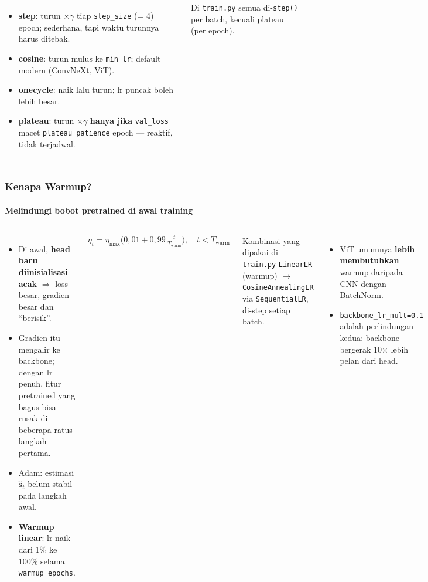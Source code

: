 \documentclass[t,aspectratio=169,xcolor={dvipsnames,table}]{beamer}
\newcommand{\con}[1]{\textcolor{dlOrange}{#1}}
\begin{document}
\begin{frame}
\begin{columns}[T]
        \begin{itemize}
            \item \textbf{step}: turun $\times\gamma$ tiap \texttt{step\_size} (= 4) epoch; sederhana, tapi waktu turunnya harus ditebak.
            \item \textbf{cosine}: turun mulus ke \texttt{min\_lr}; default modern (ConvNeXt, ViT).
            \item \textbf{onecycle}: naik lalu turun; lr puncak boleh lebih besar.
            \item \textbf{plateau}: turun $\times\gamma$ \textbf{hanya jika} \texttt{val\_loss} macet \texttt{plateau\_patience} epoch --- reaktif, tidak terjadwal.
        \end{itemize}
        {\scriptsize\color{dlMute} Di \texttt{train.py} semua di-\texttt{step()} per batch, kecuali plateau (per epoch).}
    \end{columns}
\end{frame}

\begin{frame}
    \frametitle{Kenapa Warmup?}
    \framesubtitle{Melindungi bobot pretrained di awal training}
    \footnotesize

    \begin{columns}[T]
        \begin{itemize}
            \item Di awal, \textbf{head baru diinisialisasi acak} $\Rightarrow$ loss besar, gradien besar dan ``berisik''.
            \item Gradien itu mengalir ke backbone; dengan lr penuh, fitur pretrained yang bagus bisa \con{rusak} di beberapa ratus langkah pertama.
            \item Adam: estimasi $\hat{\mathbf{s}}_t$ belum stabil pada langkah awal.
            \item \textbf{Warmup linear}: lr naik dari 1\% ke 100\% selama \texttt{warmup\_epochs}.
        \end{itemize}
        \[
            \eta_t = \eta_{\max}\Big(0{,}01 + 0{,}99\,\tfrac{t}{T_{\text{warm}}}\Big), \quad t < T_{\text{warm}}
        \]

        \begin{exampleblock}{Kombinasi yang dipakai di \texttt{train.py}}
            \texttt{LinearLR} (warmup) $\to$ \texttt{CosineAnnealingLR} via \texttt{SequentialLR}, di-step setiap batch.
        \end{exampleblock}
        \begin{itemize}
            \item ViT umumnya \textbf{lebih membutuhkan} warmup daripada CNN dengan BatchNorm.
            \item \texttt{backbone\_lr\_mult=0.1} adalah perlindungan kedua: backbone bergerak 10$\times$ lebih pelan dari head.
        \end{itemize}
    \end{columns}
\end{frame}
\end{document}
